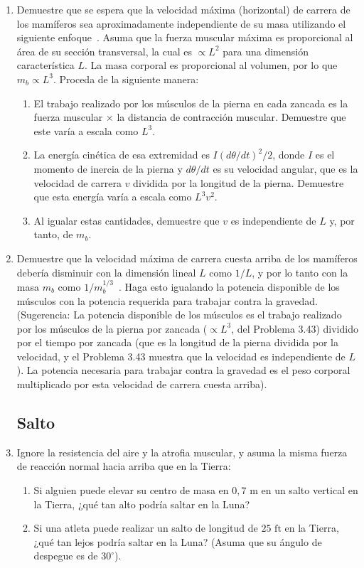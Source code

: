 \documentclass[12pt]{book}
\begin{document}
\begin{enumerate}
\item[3.43] Demuestre que se espera que la velocidad máxima (horizontal) de carrera de los mamíferos sea aproximadamente independiente de su masa utilizando el siguiente enfoque~\cite{ref95,ref130}. Asuma que la fuerza muscular máxima es proporcional al área de su sección transversal, la cual es $\propto L^2$ para una dimensión característica $L$. La masa corporal es proporcional al volumen, por lo que $m_b \propto L^3$. Proceda de la siguiente manera:
\begin{enumerate}
\item[(a)] El trabajo realizado por los músculos de la pierna en cada zancada es la fuerza muscular $\times$ la distancia de contracción muscular. Demuestre que este varía a escala como $L^3$.
\item[(b)] La energía cinética de esa extremidad es $I (d\theta/dt)^2/2$, donde $I$ es el momento de inercia de la pierna y $d\theta/dt$ es su velocidad angular, que es la velocidad de carrera $v$ dividida por la longitud de la pierna. Demuestre que esta energía varía a escala como $L^3 v^2$.
\item[(c)] Al igualar estas cantidades, demuestre que $v$ es independiente de $L$ y, por tanto, de $m_b$.
\end{enumerate}

\item[3.44] Demuestre que la velocidad máxima de carrera cuesta arriba de los mamíferos debería disminuir con la dimensión lineal $L$ como $1/L$, y por lo tanto con la masa $m_b$ como $1/m_b^{1/3}$~\cite{ref95,ref130}. Haga esto igualando la potencia disponible de los músculos con la potencia requerida para trabajar contra la gravedad. (Sugerencia: La potencia disponible de los músculos es el trabajo realizado por los músculos de la pierna por zancada ($\propto L^3$, del Problema 3.43) dividido por el tiempo por zancada (que es la longitud de la pierna dividida por la velocidad, y el Problema 3.43 muestra que la velocidad es independiente de $L$). La potencia necesaria para trabajar contra la gravedad es el peso corporal multiplicado por esta velocidad de carrera cuesta arriba).

\subsection*{Salto}

\item[3.45] Ignore la resistencia del aire y la atrofia muscular, y asuma la misma fuerza de reacción normal hacia arriba que en la Tierra:
\begin{enumerate}
\item[(a)] Si alguien puede elevar su centro de masa en $0{,}7\text{ m}$ en un salto vertical en la Tierra, ¿qué tan alto podría saltar en la Luna?
\item[(b)] Si una atleta puede realizar un salto de longitud de $25\text{ ft}$ en la Tierra, ¿qué tan lejos podría saltar en la Luna? (Asuma que su ángulo de despegue es de $30^\circ$).
\end{enumerate}


\end{enumerate}
\end{document}
